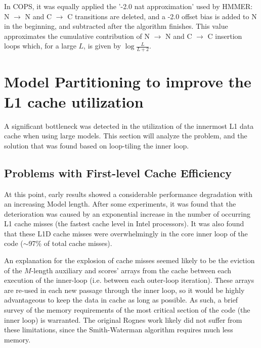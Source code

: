 In COPS, it was equally applied the '-2.0 nat approximation' used by HMMER: N $\rightarrow$ N and C $\rightarrow$ C transitions are deleted, and a -2.0 offset bias is added to N in the beginning, and subtracted after the algorithm finishes. This value approximates the cumulative contribution of N $\rightarrow$ N and C $\rightarrow$ C insertion loops which, for a large $L$, is given by $ \log  \frac{L}{L+2}$.




\section{Model Partitioning to improve the L1 cache utilization}
\label{Model Partitioning to improve the L1 cache utilization}

A significant bottleneck was detected in the utilization of the innermost L1 data cache when using large models. This section will analyze the problem, and the solution that was found based on loop-tiling the inner loop.


\subsection{Problems with First-level Cache Efficiency}
\label{Problems with First-level Cache Efficiency}

At this point, early results showed a considerable performance degradation with an increasing Model length. After some experiments, it was found that the deterioration was caused by an exponential increase in the number of occurring L1 cache misses (the fastest cache level in Intel processors). It was also found that these L1D cache misses were overwhelmingly in the core inner loop of the code ($\sim$97\% of total cache misses).

An explanation for the explosion of cache misses seemed likely to be the eviction of the $M$-length auxiliary and scores' arrays from the cache between each execution of the inner-loop (i.e. between each outer-loop iteration). These arrays are re-used in each new passage through the inner loop, so it would be highly advantageous to keep the data in cache as long as possible. As such, a brief survey of the memory requirements of the most critical section of the code (the inner loop) is warranted. The original Rognes work likely did not suffer from these limitations, since the Smith-Waterman algorithm requires much less memory.

